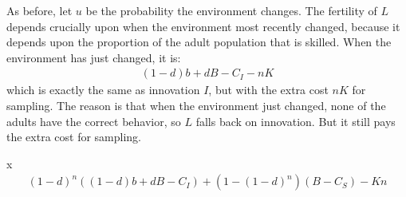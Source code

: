 \documentclass[10pt,reqno]{amsbook}
\numberwithin{equation}{chapter}
\begin{document}
As before, let $u$ be the probability the environment changes. The fertility of $L$ depends crucially upon when the environment most recently changed, because it depends upon the proportion of the adult population that is skilled. When the environment has just changed, it is:
\begin{align*}
	(1-d)b + dB - C_I - nK
\end{align*}
which is exactly the same as innovation $I$, but with the extra cost $nK$ for sampling. The reason is that when the environment just changed, none of the adults have the correct behavior, so $L$ falls back on innovation. But it still pays the extra cost for sampling.

x
\begin{align*}
	( 1 - d )^n ( (1-d)b + dB - C_I ) + ( 1 - (1-d)^n ) ( B - C_S ) - Kn
\end{align*}


\backmatter



{\small

}

\printindex

\immediate\closeout\tempfile
\end{document}
